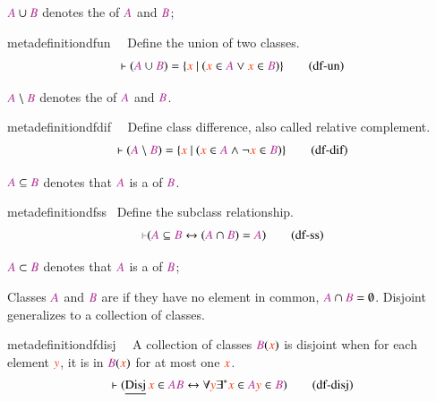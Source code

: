 \pn $\mc{A}\cup \mc{B}$ denotes the  of $\mc{A}$ and $\mc{B}$;
\begin{restatable}{metadefinition}{dfun}~~ Define the union of two classes. 
\begin{align}
\vdash ( \mc{A} \cup \mc{B} ) = \{ \msc{x}~\vert~( \msc{x} \in \mc{A} \vee \msc{x}
    \in \mc{B} ) \}\label{eq:df-un}\tag{df-un}
\end{align}
\end{restatable}

\pn $\mc{A} \setminus \mc{B}$ denotes the  of $\mc{A}$ and $\mc{B}$. 
\begin{restatable}{metadefinition}{dfdif}~~ Define class difference, also called
relative complement. 
\begin{align}
\vdash ( \mc{A} \setminus \mc{B} ) = \{ \msc{x}~\vert~( \msc{x} \in \mc{A} \wedge
    \lnot \msc{x} \in \mc{B} ) \}\label{eq:df-dif}\tag{df-dif}
\end{align}
\end{restatable}

\pn $\mc{A}\subseteq \mc{B}$ denotes that $\mc{A}$ is a  of $\mc{B}$.
\begin{restatable}{metadefinition}{dfss}~ {Define the subclass relationship.} 
\begin{align}
\mm{\vdash} ( \mc{A} \subseteq \mc{B} \leftrightarrow ( \mc{A} \cap \mc{B} ) =
    \mc{A} )\label{eq:df-ss}\tag{df-ss}
\end{align}
\end{restatable}

\pn $\mc{A}\subset \mc{B}$ denotes that $\mc{A}$ is a  of $\mc{B}$;


\pn Classes $\mc{A}$ and $\mc{B}$ are  if they have no element in common, $\mc{A}\cap \mc{B}=\emptyset$.
Disjoint generalizes to a collection of classes.
\begin{restatable}{metadefinition}{dfdisj}~~ A collection of classes $\mc{B} (
\msc{x} )$ is disjoint when for each element
       $\msc{y}$, it is in $\mc{B} ( \msc{x} )$ for at most one $\msc{x}$. 
\begin{align}
\vdash ( \operatorname{\underline{Disj}} \msc{x} \in \mc{A} \mc{B}
    \leftrightarrow \forall \msc{y} \exists^\ast \msc{x} \in \mc{A} \msc{y} \in
    \mc{B} )\label{eq:df-disj}\tag{df-disj}
\end{align}
\end{restatable}

